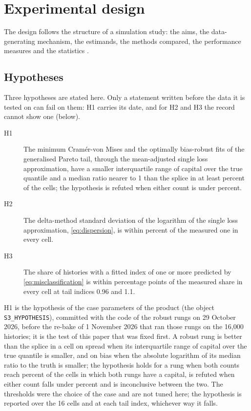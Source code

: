 \section{Experimental design}
\label{sec:experimental-design}

The design follows the structure of a simulation study: the aims, the data-generating mechanism, the estimands, the methods compared, the performance measures and the statistics \citep{morris2019}.

\subsection{Hypotheses}
\label{sec:ed-hypotheses}

Three hypotheses are stated here. Only a statement written before the data it is tested on can fail on them: H1 carries its date, and for H2 and H3 the record cannot show one (below).
\begin{description}
\item[H1] The minimum Cram\'er-von Mises and the optimally bias-robust fits of the generalised Pareto tail, through the mean-adjusted single loss approximation, have a smaller interquartile range of capital over the true quantile and a median ratio nearer to 1 than the splice in at least \rhHolds{} percent of the cells; the hypothesis is refuted when either count is under \rhRefuted{} percent.
\item[H2] The delta-method standard deviation of the logarithm of the single loss approximation, \cref{eq:dispersion}, is within \preSd{} percent of the measured one in every cell.
\item[H3] The share of histories with a fitted index of one or more predicted by \cref{eq:misclassification} is within \preShare{} percentage points of the measured share in every cell at tail indices 0.96 and 1.1.
\end{description}
H1 is the hypothesis of the case parameters of the product (the object \texttt{S3\_HYPOTHESIS}), committed with the code of the robust rungs on 29 October 2026, before the re-bake of 1 November 2026 that ran those rungs on the 16{,}000 histories; it is the test of this paper that was fixed first. A robust rung is better than the splice in a cell on spread when its interquartile range of capital over the true quantile is smaller, and on bias when the absolute logarithm of its median ratio to the truth is smaller; the hypothesis holds for a rung when both counts reach \rhHolds{} percent of the cells in which both rungs have a capital, is refuted when either count falls under \rhRefuted{} percent and is inconclusive between the two. The thresholds were the choice of the case and are not tuned here; the hypothesis is reported over the 16 cells and at each tail index, whichever way it falls.
